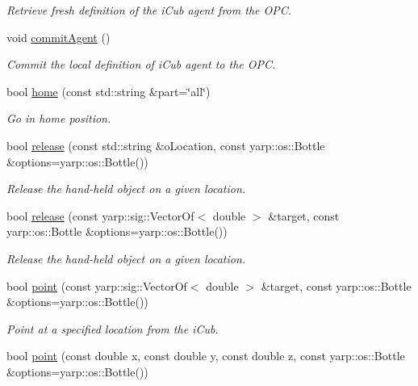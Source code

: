\begin{DoxyCompactItemize}
\begin{DoxyCompactList}\small\item\em Retrieve fresh definition of the i\+Cub agent from the O\+PC. \end{DoxyCompactList}\item 
void \hyperlink{group__icubclient__clients_a514afed176cadaaaee1fca994dde96b5}{commit\+Agent} ()
\begin{DoxyCompactList}\small\item\em Commit the local definition of i\+Cub agent to the O\+PC. \end{DoxyCompactList}\item 
bool \hyperlink{group__icubclient__clients_a2743bef01da8066f944699983fbfc6d2}{home} (const std\+::string \&part=\char`\"{}all\char`\"{})
\begin{DoxyCompactList}\small\item\em Go in home position. \end{DoxyCompactList}\item 
bool \hyperlink{group__icubclient__clients_a5b975d62f96c10225022dc6bc88f3409}{release} (const std\+::string \&o\+Location, const yarp\+::os\+::\+Bottle \&options=yarp\+::os\+::\+Bottle())
\begin{DoxyCompactList}\small\item\em Release the hand-\/held object on a given location. \end{DoxyCompactList}\item 
bool \hyperlink{group__icubclient__clients_abf66ab5453dc661233d7cc9d85b42617}{release} (const yarp\+::sig\+::\+Vector\+Of$<$ double $>$ \&target, const yarp\+::os\+::\+Bottle \&options=yarp\+::os\+::\+Bottle())
\begin{DoxyCompactList}\small\item\em Release the hand-\/held object on a given location. \end{DoxyCompactList}\item 
bool \hyperlink{group__icubclient__clients_a916d79977e918e349aee0b13567f9f18}{point} (const yarp\+::sig\+::\+Vector\+Of$<$ double $>$ \&target, const yarp\+::os\+::\+Bottle \&options=yarp\+::os\+::\+Bottle())
\begin{DoxyCompactList}\small\item\em Point at a specified location from the i\+Cub. \end{DoxyCompactList}\item 
bool \hyperlink{group__icubclient__clients_a1aeddcdd0f1b623d0b79a24ca69e728d}{point} (const double x, const double y, const double z, const yarp\+::os\+::\+Bottle \&options=yarp\+::os\+::\+Bottle())

\end{DoxyCompactItemize}
